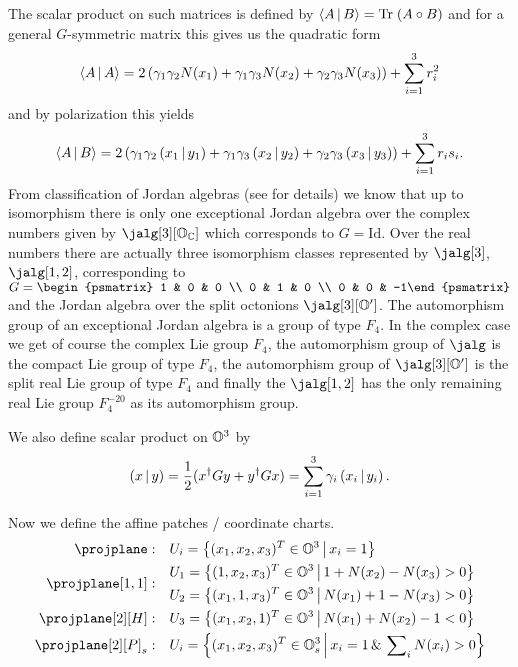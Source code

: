 The scalar product on such matrices is defined by $\langle A\,|\, B \rangle = \mathrm{Tr}\; (A \circ B)$ and for a general $G$-symmetric matrix this gives us the quadratic form
\[
	\langle A\,|\, A \rangle = 2\left( \gamma_1\gamma_2 N(x_1) + \gamma_1\gamma_3 N(x_2) + \gamma_2\gamma_3 N(x_3)\right) + \sum_{i=1}^{3} r_i^2
\]
and by polarization this yields
\begin{equation}\label{eq:jscal1}
\langle A\,|\, B \rangle = 2\left( \gamma_1\gamma_2 \left( x_1 \,|\, y_1 \right) + \gamma_1\gamma_3 \left( x_2 \,|\, y_2 \right) + \gamma_2\gamma_3\left( x_3 \,|\, y_3 \right) \right) + \sum_{i=1}^3 r_i s_i.
\end{equation}
From classification of Jordan algebras (see \cite{springer_octonions_2000} for details) we know that up to isomorphism  there is only one exceptional Jordan algebra over the complex numbers given by $\jalg[3][\octo_\complex]$ which corresponds to $G=\mathrm{Id}$. Over the real numbers there are actually three isomorphism classes represented by $\jalg[3]$, $\jalg[1,2]$, corresponding to $G = \begin{psmatrix} 1 & 0 & 0 \\ 0 & 1 & 0 \\ 0 & 0 & -1\end{psmatrix}$ and the Jordan algebra over the split octonions $\jalg[3][\octo']$. The automorphism group of an exceptional Jordan algebra is a group of type $F_4$. In the complex case we get of course the complex Lie group $F_4$, the automorphism group of $\jalg$ is the compact Lie group of type $F_4$, the automorphism group of $\jalg[3][\octo']$ is the split real Lie group of type $F_4$ and finally the $\jalg[1,2]$ has the only remaining real Lie group $F_4^{-20}$ as its automorphism group. 

We also define scalar product on $\mathbb{O}^3$ by \[\left( x \,|\, y \right) = \frac{1}{2}(x^\dagger G y + y^\dagger G x) = \sum_{i=1}^3 \gamma_i\left( x_i \,|\, y_i \right).\] 

Now we define the affine patches / coordinate charts.
\begin{align}
\projplane: & \quad U_i = \set{(x_1, x_2, x_3)^T \in \octo^3 \,\middle|\, x_i = 1} \\
\projplane[1,1]:  & \quad 
	\begin{aligned}
			U_1 &= \set{(1, x_2, x_3)^T \in \octo^3 \,\middle|\, 1 + N(x_2) - N(x_3) > 0} \\
			U_2 &= \set{(x_1, 1, x_3)^T \in \octo^3 \,\middle|\, N(x_1) + 1  - N(x_3) > 0} \\
    \end{aligned} \\
\projplane[2][H]:  & \quad U_3 = \set{(x_1, x_2, 1)^T \in \octo^3 \,\middle|\, N(x_1) + N(x_2) - 1 < 0} \\
\projplane[2][P]_s: & \quad U_i = \set{(x_1, x_2, x_3)^T \in \octo_s^3 \,\middle|\, x_i = 1 \,\&\, \sum\nolimits_i N(x_i) > 0}
\end{align}

